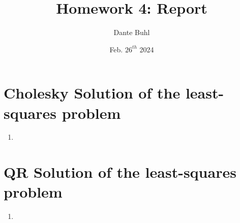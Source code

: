 \documentclass{article}
\title{Homework 4: Report}
\author{Dante Buhl}
\date{Feb. $26^{th}$ 2024}
\begin{document}
\newcommand{\bs}[1]{\boldsymbol{#1}}
\newcommand{\bmp}[1]{\begin{minipage}{#1\textwidth}}
\newcommand{\emp}{\end{minipage}}
\newcommand{\R}{\mathbb{R}}
\newcommand{\C}{\mathbb{C}}
\newcommand{\N}{\mathcal{N}}
\newcommand{\I}{\mathrm{I}}
\newcommand{\K}{\bs{\mathrm{K}}}
\newcommand{\m}{\bs{\mu}_*}
\newcommand{\s}{\bs{\Sigma}_*}
\newcommand{\dt}{\Delta t}
\newcommand{\tr}[1]{\text{Tr}(#1)}
\newcommand{\Tr}[1]{\text{Tr}(#1)}

\maketitle


\setcounter{section}{1}

\section{Cholesky Solution of the least-squares problem}
\begin{enumerate}
\item 

\end{enumerate}

\section{QR Solution of the least-squares problem}
\begin{enumerate}
\item 

\end{enumerate}
\end{document}
